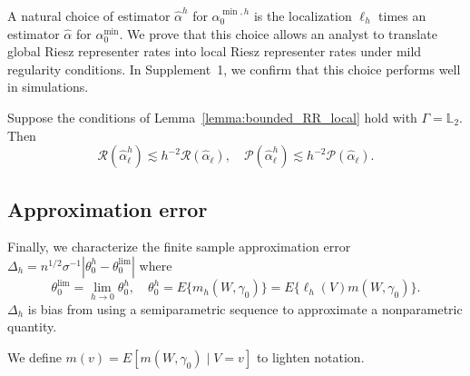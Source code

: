 A natural choice of estimator $\hat{\alpha}^h$ for $\alpha_0^{\min,h}$ is the localization $\ell_h$ times an estimator $\hat{\alpha}$ for $\alpha^{\min}_0$. We prove that this choice allows an analyst to translate global Riesz representer rates into local Riesz representer rates under mild regularity conditions. In Supplement~1, we confirm that this choice performs well in simulations.

\begin{lemma}\label{lemma:translate_RR}
Suppose the conditions of Lemma~\ref{lemma:bounded_RR_local} hold with $\Gamma=\mathbb{L}_2$. Then
$$
\mathcal{R}(\hat{\alpha}^h_{\ell}) \lesssim h^{-2} \mathcal{R}(\hat{\alpha}_{\ell}),\quad \mathcal{P}(\hat{\alpha}^h_{\ell}) \lesssim h^{-2} \mathcal{P}(\hat{\alpha}_{\ell}).
$$
\end{lemma}

\subsection{Approximation error}

Finally, we characterize the finite sample approximation error $\Delta_h=
n^{1/2} \sigma^{-1}|\theta_0^h-\theta_0^{\lim}|$ where 
$$
\theta^{\lim}_{0}=\lim_{h\rightarrow 0} \theta_0^h,\quad \theta_0^h=E\{m_h(W,\gamma_0)\}=E\{\ell_h(V) m(W,\gamma_0)\}.
$$
$\Delta_h$ is bias from using a semiparametric sequence to approximate a nonparametric quantity.

We define $m(v)= E [m(W, \gamma_0) \mid V=v]$ to lighten notation.

